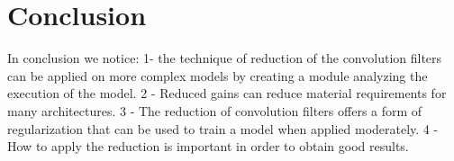 \documentclass[12pt]{article}
\begin{document}
\newpage
\section*{Conclusion}

In conclusion we notice: 1- the technique of reduction of the convolution filters can be applied on more complex models by creating a module analyzing the execution of the model. 2 - Reduced gains can reduce material requirements for many architectures. 3 - The reduction of convolution filters offers a form of regularization that can be used to train a model when applied moderately. 4 - How to apply the reduction is important in order to obtain good results.

\newpage



\end{document}
